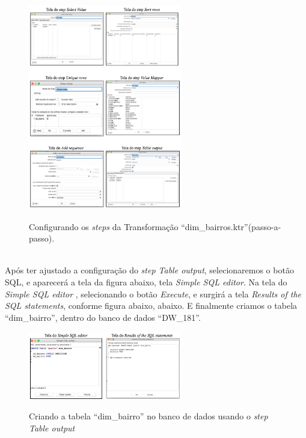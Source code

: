 \begin{figure}[H]
	\vspace*{0,2cm}
    \centering
    \caption{Configurando os \textit{steps} da Transforma\c{c}\~{a}o ``dim\_bairros.ktr''(passo-a-passo).}
    \includegraphics[width=0.6\textwidth]{./04-figuras/figura-passos-dim-bairros}
    \label{fig:ilustfigpassasdimbairros}
\end{figure}
\vspace*{-0,9cm}
{\raggedright {}} \\

Ap\'os ter ajustado a configura\c{c}\~{a}o do \textit{step Table output}, selecionaremos o bot\~{a}o SQL, e aparecer\'{a} a tela da figura abaixo, tela \textit{Simple SQL editor}. Na tela do \textit{Simple SQL editor} , selecionando o bot\~{a}o \textit{Execute}, e surgir\'{a} a tela \textit{Results of the SQL statements}, conforme figura abaixo, abaixo. E finalmente criamos o tabela ``dim\_bairro'', dentro do banco de dados 
``DW\_181''.

\begin{figure}[H]
	\vspace*{0,2cm}
    \centering
    \caption{Criando a tabela ``dim\_bairro'' no banco de dados usando o \textit{step Table output}}
    \includegraphics[width=0.6\textwidth]{./04-figuras/figura-tb-dim-bairro}
    \label{fig:ilustfigtbdimbairros}
\end{figure}
\vspace*{-0,9cm}
{\raggedright {}} \\

